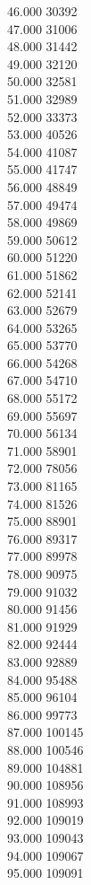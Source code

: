 { 46.000	30392 \\
 47.000	31006 \\
 48.000	31442 \\
 49.000	32120 \\
 50.000	32581 \\
 51.000	32989 \\
 52.000	33373 \\
 53.000	40526 \\
 54.000	41087 \\
 55.000	41747 \\
 56.000	48849 \\
 57.000	49474 \\
 58.000	49869 \\
 59.000	50612 \\
 60.000	51220 \\
 61.000	51862 \\
 62.000	52141 \\
 63.000	52679 \\
 64.000	53265 \\
 65.000	53770 \\
 66.000	54268 \\
 67.000	54710 \\
 68.000	55172 \\
 69.000	55697 \\
 70.000	56134 \\
 71.000	58901 \\
 72.000	78056 \\
 73.000	81165 \\
 74.000	81526 \\
 75.000	88901 \\
 76.000	89317 \\
 77.000	89978 \\
 78.000	90975 \\
 79.000	91032 \\
 80.000	91456 \\
 81.000	91929 \\
 82.000	92444 \\
 83.000	92889 \\
 84.000	95488 \\
 85.000	96104 \\
 86.000	99773 \\
 87.000	100145 \\
 88.000	100546 \\
 89.000	104881 \\
 90.000	108956 \\
 91.000	108993 \\
 92.000	109019 \\
 93.000	109043 \\
 94.000	109067 \\
 95.000	109091 \\
}
